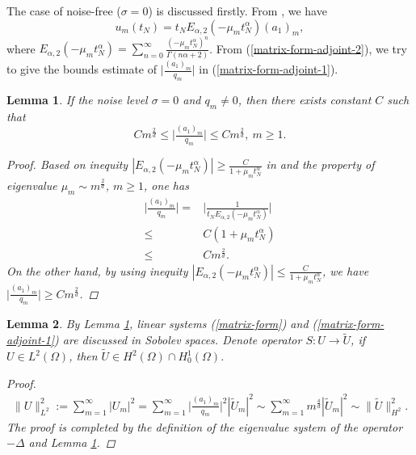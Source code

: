 \documentclass[11pt]{article}
\newtheorem{lemma}{Lemma}[section]
\numberwithin{equation}{section}
\begin{document}
The case of noise-free ($\sigma=0$) is discussed firstly.
From \cite{LiZhang2024}, we have
\begin{equation}\label{matrix-form-adjoint-2}
u_m(t_N)=t_NE_{\alpha,2}(-\mu_m t_N^\alpha)(a_1)_m, 
\end{equation}
where $E_{\alpha,2}(-\mu_m t_N^\alpha)=\sum_{n=0}^\infty\frac{(-\mu_mt_N^\alpha)^n}{\Gamma{(n\alpha+2)}}$.
From (\ref{matrix-form-adjoint-2}), we try to give the bounds estimate of $\big|\frac{(a_1)_m}{q_m}\big|$ in (\ref{matrix-form-adjoint-1}). 
\begin{lemma}\label{bounds}
If the noise level $\sigma=0$ and $q_m\neq0$, then there exists constant $C$ such that
$$Cm^{\frac{2}{d}}\le\big|\tfrac{(a_1)_m}{q_m}\big|\le Cm^{\frac{2}{d}},~ m\ge1.$$
\begin{proof}
Based on inequity $|E_{\alpha,2}(-\mu_m t_N^\alpha)|\geq \frac{C}{1+\mu_mt_N^\alpha}$ in \cite{podlubny1999fractional} and the property of eigenvalue $\mu_m\sim m^{\frac{2}{d}}$, $m\ge 1$, one has
\begin{align}\nonumber
\bigg|\frac{(a_1)_m}{q_m}\bigg|
=& \bigg|\frac{1}{t_NE_{\alpha,2}(-\mu_m t_N^\alpha)}\bigg| \\ \nonumber
\leq &C(1+\mu_mt_N^\alpha)\\ \label{matrix-form-adjoint-3}
\leq &Cm^{\frac{2}{d}}.
\end{align}
On the other hand, by using inequity $|E_{\alpha,2}(-\mu_m t_N^\alpha)|\le \frac{C}{1+\mu_mt_N^\alpha}$, we have
$\big|\tfrac{(a_1)_m}{q_m}\big|
\ge Cm^{\frac{2}{d}}$.    
\end{proof}   
\end{lemma}

\begin{lemma}\label{map}By Lemma \ref{bounds}, linear systems (\ref{matrix-form}) and (\ref{matrix-form-adjoint-1}) are discussed in Sobolev spaces.
Denote operator $S:U\rightarrow \widetilde{U}$, if $U\in L^2(\Omega)$, then $\widetilde{U}\in H^2(\Omega)\cap H_0^1(\Omega)$.
\begin{proof}
\begin{align*}
\|U\|_{L^2}^2:=\sum_{m=1}^\infty|U_m|^2=\sum_{m=1}^\infty\big|\tfrac{(a_1)_m}{q_m}\big|^2|\widetilde{U}_m|^2\sim\sum_{m=1}^\infty m^{\frac{4}{d}}|\widetilde{U}_m|^2\sim\|\widetilde{U}\|_{H^2}^2.
\end{align*}   
The proof is completed by the definition of the eigenvalue system of the operator $-\Delta$ and Lemma \ref{bounds}.
\end{proof}   
\end{lemma}
\end{document}
